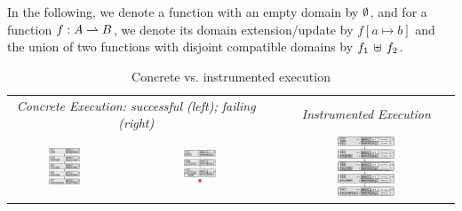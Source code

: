  In the following, we denote a function with an empty domain by $\emptyset$, and for a function $f : A \rightharpoonup B$, we denote its domain extension/update by $f[a \mapsto b]$ %
and the union of two functions with disjoint compatible domains by $f_1 \, \uplus \, f_2$. 

\begin{table}[t!]
\centering 
{\scriptsize \begin{tabular}{@{}c@{}ccc@{}c@{}}\toprule
\multicolumn{3}{c}{{\it Concrete Execution: successful (left); failing (right)}} & &  \emph{Instrumented Execution}  \\
\cmidrule{1-3} \cmidrule{5-5}
{\includegraphics[width=0.305\textwidth,valign=T]{figures/conc_exec.png}} & & 
{\includegraphics[width=0.265\textwidth,valign=T]{figures/conc_wrong_exec.png}} & & 
{\includegraphics[width=0.347\textwidth,valign=T]{figures/inst_exec.png}}  \\  
\bottomrule
\end{tabular}}
\vspace{2pt}
\caption{Concrete vs. instrumented execution\label{example:symb:states:vs:assertions}}
\vspace*{-0.9cm}
\end{table}

